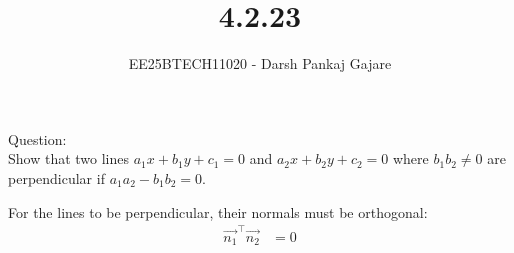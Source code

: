 \documentclass[journal,12pt,onecolumn]{IEEEtran}
\begin{document}
\title{4.2.23}
\author{EE25BTECH11020 - Darsh Pankaj Gajare}
{\let\newpage\relax\maketitle}
Question:\\
Show that two lines $a_1x+b_1y+c_1=0$ and $a_2x+b_2y+c_2=0$ where $b_1b_2\neq0$ are perpendicular if $a_1a_2-b_1b_2=0$.\\
\solution
\begin{table}[H]
	\centering
	\caption{}
	
	\label{}
\end{table}

For the lines to be perpendicular, their normals must be orthogonal:
\begin{align}
    \vec{n_1}^\top \vec{n_2} &= 0
\end{align}
\end{document}
